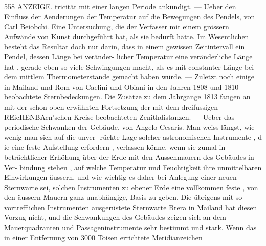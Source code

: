 \documentclass[12pt,a4paper]{article}
\begin{document}
\newpage
558  ANZEIGE.\newline
tricität mit einer langen Periode ankündigt. --- Ueber den Einfluss der Aenderungen der Temperatur\newline
auf die Bewegungen des Pendels, von Carl Beiobchi. Eine Untersuchung, die der Verfasser mit einem\newline
grössern Aufwände von Kunst durchgeführt hat, als sie bedurft hätte. Im Wesentlichen besteht das\newline
Resultat doch nur darin, dass in einem gewissen Zeitintervall ein Pendel, dessen Länge bei veränder-\newline
licher Temperatur eine veränderliche Länge hat , gerade eben so viele Schwingungen macht, als es mit\newline
constanter Länge bei dem mittlem Thermometerstande gemacht haben würde. --- Zuletzt noch einige\newline
in Mailand und Rom von Caelini und Obiani in den Jahren 1808 und 1810 beobachtete Sternbedeckungen.\newline
Die Zusätze zu dem Jahrgange 1813 fangen an mit der schon oben erwähnten Fortsetzung der\newline
mit dem dreifussigen REicHENBAcn'schen Kreise beobachteten Zenithdistanzen. --- Ueber das periodische\newline
Schwanken der Gebäude, von Angelo Cesaris. Man weiss längst, wie wenig man sich auf die unver-\newline
rückte Lage solcher astronomischen Instrumente , d ie eine feste Aufstellung erfordern , verlassen könne,\newline
wenn sie zumal in beträchtlicher Erhöhung über der Erde mit den Aussenmauern des Gebäudes in Ver-\newline
bindung stehen , auf welche Temperatur und Feuchtigkeit ihre unmittelbaren Einwirkungen äussern,\newline
und wie wichtig es daher bei Anlegung einer neuen Sternwarte sei, solchen Instrumenten zu ebener\newline
Erde eine vollkommen feste , von den äussern Mauern ganz unabhängige, Basis zu geben. Die übrigens\newline
mit so vortrefflichen Instrumenten ausgerüstete Sternwarte Brera in Mailand hat diesen Vorzug nicht,\newline
und die Schwankungen des Gebäudes zeigen sich an dem Mauerquadranten und Passageninstrumente\newline
sehr bestimmt und stark. Wenn das in einer Entfernung von 3000 Toisen errichtete Meridianzeichen\newline
\end{document}

